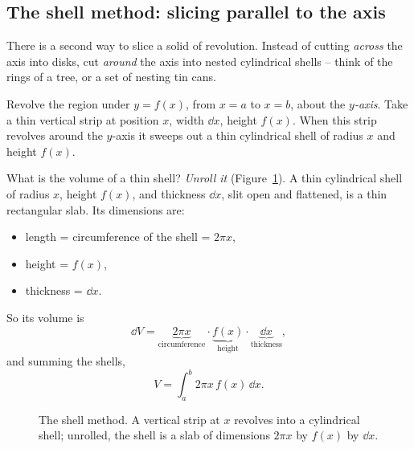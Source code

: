\subsection{The shell method: slicing parallel to the axis}

There is a second way to slice a solid of revolution. Instead of
cutting \emph{across} the axis into disks, cut \emph{around} the axis into nested
cylindrical shells -- think of the rings of a tree, or a set of nesting tin cans.

Revolve the region under $y=f(x)$, from $x=a$ to $x=b$, about the \emph{$y$-axis}.
Take a thin vertical strip at position $x$, width $\dd x$, height $f(x)$. When this
strip revolves around the $y$-axis it sweeps out a thin cylindrical shell of radius
$x$ and height $f(x)$.

What is the volume of a thin shell? \emph{Unroll
it} (Figure~\ref{ch26:fig-shell}). A thin cylindrical shell of radius $x$, height $f(x)$, and thickness $\dd x$,
slit open and flattened, is a thin rectangular slab. Its dimensions are:
\begin{itemize}
  \item length = circumference of the shell = $2\pi x$,
  \item height = $f(x)$,
  \item thickness = $\dd x$.
\end{itemize}
So its volume is
\[
  \dd V = \underbrace{2\pi x}_{\text{circumference}}\cdot
          \underbrace{f(x)}_{\text{height}}\cdot
          \underbrace{\dd x}_{\text{thickness}},
\]
and summing the shells,
\[
  \boxed{\,V = \int_a^b 2\pi x\,f(x)\,\dd x.\,}
\]

\begin{figure}[H]
\centering
{}
\caption{The shell method. A vertical strip at $x$ revolves into a cylindrical
shell; unrolled, the shell is a slab of dimensions $2\pi x$ by $f(x)$ by $\dd x$.}
\label{ch26:fig-shell}
\end{figure}

